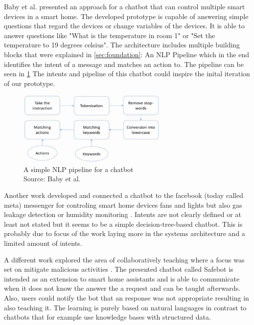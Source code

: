 Baby et al.\cite{baby_home_2017} presented an approach for a chatbot that can control multiple smart devices in a smart home.
The developed prototype is capable of answering simple questions that regard the devices or change variables of the devices.
It is able to answer questions like "What is the temperature in room 1" or "Set the temperature to 19 degrees celsius".
The architecture includes multiple building blocks that were explained in \cref{sec:foundation}: An NLP Pipeline which in the end identifies the intent of a message and matches an action to.
The pipeline can be seen in \cref{fig:chatbot-pipeline-baby}
The intents and pipeline of this chatbot could inspire the inital iteration of our prototype. 
\begin{figure}[h]
\centering
\includegraphics[width=0.66\textwidth]{graphics/baby2017chatbot.png}
\caption{A simple NLP pipeline for a chatbot \\Source: Baby et al. \cite{baby_home_2017}}
\label{fig:chatbot-pipeline-baby}
\end{figure}

Another work developed and connected a chatbot to the facebook (today called meta) messenger for controling smart home devices fans and lights but also gas leakage detection or humidity monitoring \cite{ahmed_smart_2020}.
Intents are not clearly defined or at least not stated but it seems to be a simple decision-tree-based chatbot.
This is probably due to focus of the work laying more in the systems architecture and a limited amount of intents.

A different work explored the area of collaboratively teaching where a focus was set on mitigate malicious activities \cite{chkroun_safe_2021}.
The presented chatbot called Safebot is intended as an extension to smart home assistants and is able to communicate when it does not know the answer the a request and can be taught afterwards.
Also, users could notify the bot that an response was not appropriate resulting in also teaching it.
The learning is purely based on natural languages in contrast to chatbots that for example use knowledge bases with structured data.

